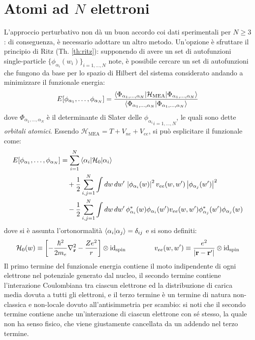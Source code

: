 
\section{Atomi ad \texorpdfstring{$ N $}{N} elettroni}

L'approccio perturbativo non dà un buon accordo coi dati sperimentali per $ N \ge 3 $: di conseguenza, è necessario adottare un altro metodo. Un'opzione è sfruttare il principio di Ritz (Th. \ref{th:ritz}): supponendo di avere un set di autofunzioni single-particle $ \{\phi_{\alpha_i}(w_i)\}_{i = 1, \dots, N} $ note, è possibile cercare un set di autofunzioni che fungono da base per lo spazio di Hilbert del sistema considerato andando a minimizzare il funzionale energia:
\begin{equation}
	E[\phi_{\alpha_1}, \dots, \phi_{\alpha_N}] = \frac{\braket{\Phi_{\alpha_1, \dots, \alpha_N} | \mathcal{H}_\text{MEA} | \Phi_{\alpha_1, \dots, \alpha_N}}}{\braket{\Phi_{\alpha_1, \dots, \alpha_N} | \Phi_{\alpha_1, \dots, \alpha_N}}}
	\label{eq:en-functional-def}
\end{equation}
dove $ \Phi_{\alpha_1, \dots, \alpha_N} $ è il determinante di Slater delle $ {\phi_{\alpha_i}}_{i = 1, \dots, N} $, le quali sono dette \textit{orbitali atomici}. Essendo $ \mathcal{H}_\text{MEA} = T + V_{ne} + V_{ee} $, si può esplicitare il funzionale come:
\begin{equation}
	\begin{split}
		E[\phi_{\alpha_1}, \dots, \phi_{\alpha_N}]
		& = \sum_{i = 1}^{N} \braket{\alpha_i | \mathcal{H}_0 | \alpha_i} \\
		& \quad + \frac{1}{2} \sum_{i,j = 1}^{N} \int dw\,dw'\, \left\lvert\phi_{\alpha_i}(w)\right\rvert^2 v_{ee}(w,w') \left\lvert\phi_{\alpha_j}(w')\right\rvert^2 \\
		& \quad - \frac{1}{2} \sum_{i,j = 1}^{N} \int dw\,dw'\, \phi_{\alpha_i}^*(w) \phi_{\alpha_i}(w') v_{ee}(w,w') \phi_{\alpha_j}^*(w') \phi_{\alpha_j}(w)
	\end{split}
	\label{eq:en-functional}
\end{equation}
dove si è assunta l'ortonormalità $ \braket{\alpha_i | \alpha_j} = \delta_{ij} $ e si sono definiti:
\begin{equation}
	\mathcal{H}_0(w) \equiv \left[ -\frac{\hbar^2}{2m_e} \nabla^2_{\mathbf{r}} - \frac{Ze^2}{r} \right] \otimes \operatorname{id}_\text{spin}
	\qquad \qquad
	v_{ee}(w,w') \equiv \frac{e^2}{\left\lvert\mathbf{r} - \mathbf{r}'\right\rvert} \otimes \operatorname{id}_\text{spin}
\end{equation}
Il primo termine del funzionale energia contiene il moto indipendente di ogni elettrone nel potenziale generato dal nucleo, il secondo termine contiene l'interazione Coulombiana tra ciascun elettrone ed la distribuzione di carica media dovuta a tutti gli elettroni, e il terzo termine è un termine di natura non-classica e non-locale dovuto all'antisimmetria per scambio: si noti che il secondo termine contiene anche un'interazione di ciascun elettrone con sé stesso, la quale non ha senso fisico, che viene giustamente cancellata da un addendo nel terzo termine.

